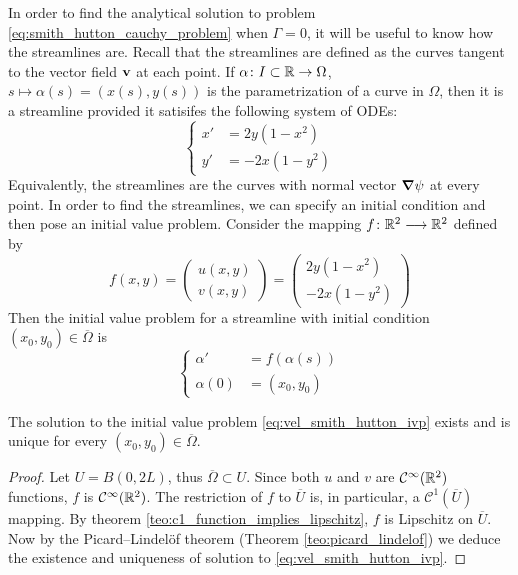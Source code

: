 In order to find the analytical solution to problem
\eqref{eq:smith_hutton_cauchy_problem} when $\Gamma = 0$, it will be useful to
know how the streamlines are. Recall that the streamlines are defined as the
curves tangent to the vector field $\vb{v}$ at each point. If $\alpha \colon I
\subset \mathbb{R} \to \Omega$, $s \mapsto \alpha(s) = (x(s), y(s))$ is the
parametrization of a curve in $\Omega$, then it is a streamline provided it
satisifes the following system of ODEs:
\begin{equation} \label{eq:velocity_smith_hutton_odes}
	\left\{
	\begin{aligned}
		x' &= 2 y (1 - x^2) \\
		y' &= - 2 x (1 - y^2)
	\end{aligned}
	\right.
\end{equation}
Equivalently, the streamlines are the curves with normal vector $\grad{\psi}$
at every point. In order to find the streamlines, we can specify an initial
condition and then pose an initial value problem. Consider the mapping $f \colon
\mathbb{R}^2 \longrightarrow \mathbb{R}^2$ defined by
\begin{equation}
	f(x,y) = 
	\begin{pmatrix}
		u(x,y) \\ v(x,y)
	\end{pmatrix} =
	\begin{pmatrix}
		2 y (1 - x^2) \\ - 2 x (1 - y^2)
	\end{pmatrix}
\end{equation}
Then the initial value problem for a streamline with initial condition $(x_0,y_0) \in \overline{\Omega}$ is
\begin{equation} \label{eq:vel_smith_hutton_ivp}
	\left\{
		\begin{aligned}
			\alpha' &= f(\alpha(s)) \\
			\alpha(0) &= (x_0, y_0)
		\end{aligned}
	\right.
\end{equation}

\begin{prop}
	The solution to the initial value problem \eqref{eq:vel_smith_hutton_ivp}
	exists and is unique for every $(x_0, y_0) \in \overline{\Omega}$.
\end{prop}
\begin{proof}
	Let $U = B(0,2L)$, thus $\overline{\Omega} \subset U$. Since both $u$ and
	$v$ are $\mathcal{C}^\infty(\mathbb{R}^2)$ functions, $f$ is
	$\mathcal{C}^\infty(\mathbb{R}^2)$. The restriction of $f$ to $\overline{U}$ is,
	in particular, a $\mathcal{C}^1(\overline{U})$ mapping. By theorem
	\ref{teo:c1_function_implies_lipschitz}, $f$ is Lipschitz on $\overline{U}$.
	Now by the Picard--Lindelöf theorem (Theorem \ref{teo:picard_lindelof}) we
	deduce the existence and uniqueness of solution to
	\eqref{eq:vel_smith_hutton_ivp}.
\end{proof}

